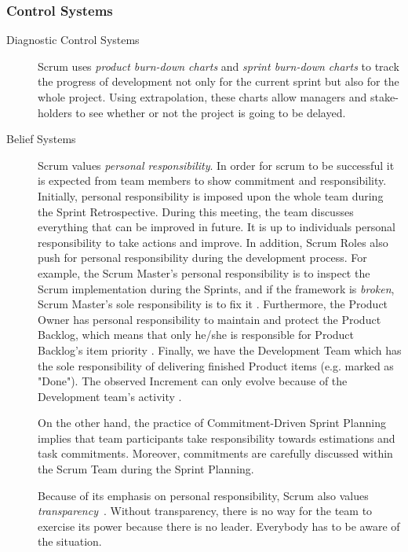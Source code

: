 \subsubsection{Control Systems}
\begin{description}
\item[Diagnostic Control Systems]
Scrum uses \emph{product burn-down charts} and \emph{sprint burn-down charts} to track the progress of development not only for the current sprint but also for the whole project.
Using extrapolation, these charts allow managers and stake-holders to see whether or not the project is going to be delayed.

\item[Belief Systems]
Scrum values \emph{personal responsibility}. In order for \ac{scrum} to be successful it is expected from team members to show commitment and responsibility. Initially, personal responsibility is imposed upon the whole team during the Sprint Retrospective. During this meeting, the team discusses everything that can be improved in future. It is up to individuals personal responsibility to take actions and improve. In addition, Scrum Roles also push for personal responsibility during the development process. For example, the Scrum Master's personal responsibility is to inspect the Scrum implementation during the Sprints, and if the framework is \textit{broken}, Scrum Master's sole responsibility is to fix it \citep[page 6]{schwaber2011scrum}. 
Furthermore, the Product Owner has personal responsibility to maintain and protect the Product Backlog, which means that only he/she is responsible for Product Backlog's item priority \citep[page 5]{schwaber2011scrum}. 
Finally, we have the Development Team which has the sole responsibility of delivering finished Product items (e.g. marked as "Done"). The observed Increment can only evolve because of the Development team's activity \citep[page 5]{schwaber2011scrum}.

On the other hand, the practice of Commitment-Driven Sprint Planning implies that team participants take responsibility towards estimations and task commitments. Moreover, commitments are carefully discussed within the Scrum Team during the Sprint Planning. 

Because of its emphasis on personal responsibility, Scrum also values \emph{transparency}~\citep[page 4]{schwaber2011scrum}.
Without transparency, there is no way for the team to exercise its power because there is no leader.
Everybody has to be aware of the situation.


\end{description}
